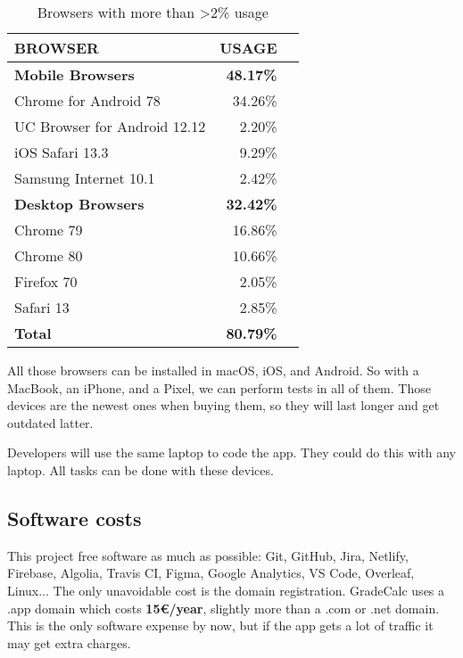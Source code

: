 \begin{table}[h!]
\centering
\begin{tabular}{lrr}
    \toprule
    \textbf{BROWSER}& \textbf{USAGE} \\
    \midrule
    \textbf{Mobile Browsers} & \textbf{48.17\%} \\
    \midrule
    \hspace{3mm}Chrome for Android 78 & 34.26\% \\
    \hspace{3mm}UC Browser for Android 12.12 & 2.20\% \\
    \hspace{3mm}iOS Safari 13.3 & 9.29\% \\
    \hspace{3mm}Samsung Internet 10.1 & 2.42\% \\
    \midrule
    \textbf{Desktop Browsers} & \textbf{32.42\%} \\
    \midrule
    \hspace{3mm}Chrome 79 & 16.86\% \\
    \hspace{3mm}Chrome 80 & 10.66\% \\
    \hspace{3mm}Firefox 70 & 2.05\% \\
    \hspace{3mm}Safari 13 & 2.85\% \\
    \midrule
    \textbf{Total} & \textbf{80.79\%} \\
    \bottomrule
\end{tabular}
\caption{Browsers with more than >2\% usage \cite{browserl.ist}}
\label{browser-list-table}
\end{table}

All those browsers can be installed in macOS, iOS, and Android. So with a MacBook, an iPhone, and a Pixel, we can perform tests in all of them. Those devices are the newest ones when buying them, so they will last longer and get outdated latter.

Developers will use the same laptop to code the app. They could do this with any laptop. All tasks can be done with these devices.

\newpage
\subsection{Software costs}

This project free software as much as possible: Git, GitHub, Jira, Netlify, Firebase, Algolia, Travis CI, Figma, Google Analytics, VS Code, Overleaf, Linux...
The only unavoidable cost is the domain registration. GradeCalc uses a .app domain which costs \textbf{15€/year}, slightly more than a .com or .net domain. This is the only software expense by now, but if the app gets a lot of traffic it may get extra charges.


